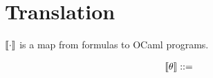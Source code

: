 \documentclass{article}
\begin{document}
\section{Translation}

\( \llbracket \cdot \rrbracket \) is a map from \nuHFLZ{} formulas to OCaml programs.

\begin{align*}
  \llbracket \theta \rrbracket ::= 
\end{align*}
\end{document}

